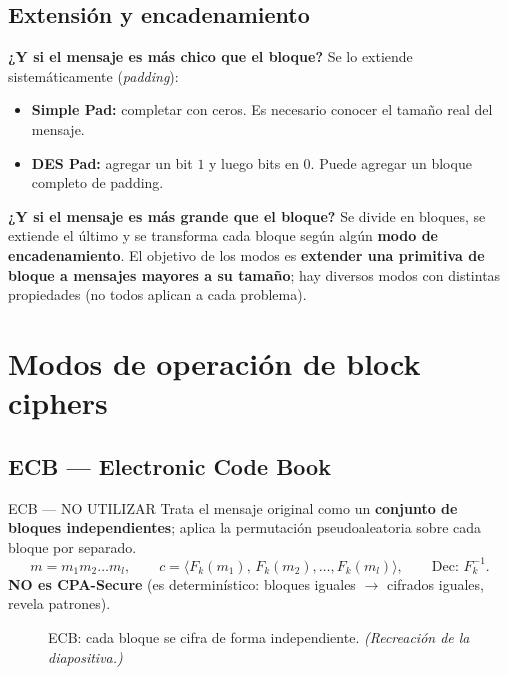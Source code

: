 \documentclass[11pt,a4paper]{article}
\begin{document}
\subsection{Extensión y encadenamiento}

\begin{slidebox}
\textbf{¿Y si el mensaje es más chico que el bloque?} Se lo extiende sistemáticamente
(\emph{padding}):
\begin{itemize}[leftmargin=1.3em,itemsep=1pt]
  \item \textbf{Simple Pad:} completar con ceros. Es necesario conocer el tamaño real del
        mensaje.
  \item \textbf{DES Pad:} agregar un bit $1$ y luego bits en $0$. Puede agregar un bloque
        completo de padding.
\end{itemize}
\textbf{¿Y si el mensaje es más grande que el bloque?} Se divide en bloques, se extiende
el último y se transforma cada bloque según algún \textbf{modo de encadenamiento}. El
objetivo de los modos es \textbf{extender una primitiva de bloque a mensajes mayores a su
tamaño}; hay diversos modos con distintas propiedades (no todos aplican a cada problema).
\end{slidebox}

\section{Modos de operación de block ciphers}

\subsection{ECB — Electronic Code Book}

\begin{warnbox}{ECB — \textcolor{attackRed}{NO UTILIZAR}}
Trata el mensaje original como un \textbf{conjunto de bloques independientes}; aplica la
permutación pseudoaleatoria sobre cada bloque por separado.
\[
  m=m_1m_2\dots m_l,\qquad
  c=\langle F_k(m_1),\,F_k(m_2),\dots,F_k(m_l)\rangle,\qquad
  \text{Dec: } F_k^{-1}.
\]
\textbf{NO es CPA-Secure} (es determinístico: bloques iguales $\to$ cifrados iguales,
revela patrones).
\end{warnbox}

\begin{figure}[h]
\centering
{}
\caption{ECB: cada bloque se cifra de forma independiente. \textit{(Recreación de la
diapositiva.)}}
\end{figure}
\end{document}
